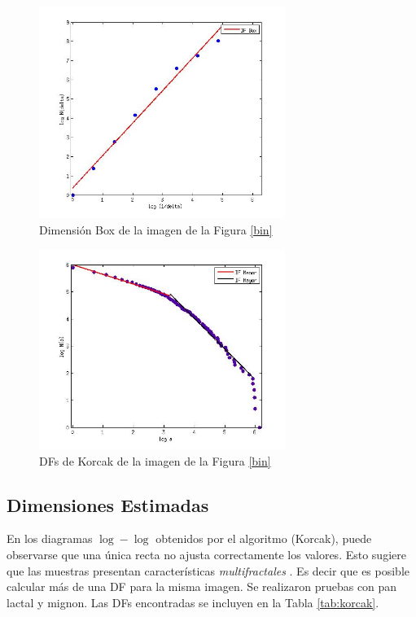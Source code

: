 \begin{figure}
\centering
\includegraphics[width=8cm]{figures/fitbox}
\caption{Dimensi\'on Box de la imagen de la Figura \ref{bin}}
\label{fitbox}
\end{figure}


\begin{figure}
\centering
\includegraphics[width=8cm]{figures/lactal1PlotKorcak}
\caption{DFs de Korcak de la imagen de la Figura \ref{bin}}
\label{fit}
\end{figure}

\subsection{Dimensiones Estimadas}

En los diagramas $\log-\log $ obtenidos por el algoritmo (Korcak), puede observarse que una \'unica recta no ajusta correctamente los valores. Esto sugiere que las muestras presentan caracter\'isticas {\em multifractales} \cite{Mandelbrot1989}. Es decir que es posible calcular m\'as de una DF para la misma imagen. Se realizaron pruebas con pan lactal y mignon. Las DFs encontradas se incluyen en la Tabla \ref{tab:korcak}.


